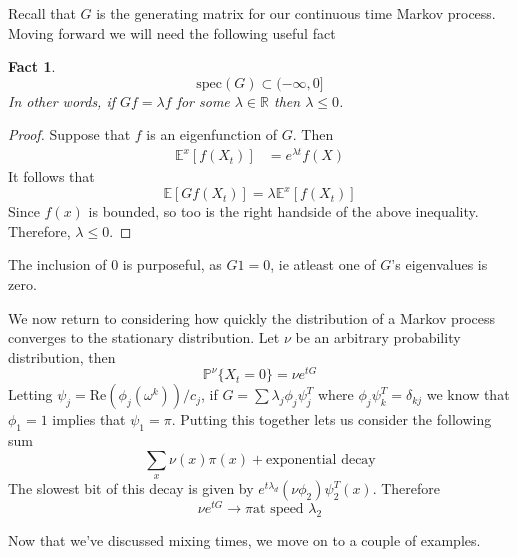 \documentclass{article}
\newtheorem{fact}{Fact}
\begin{document}
	Recall that $G$ is the generating matrix for our continuous time Markov process. Moving forward we will need the following useful fact
	
\begin{fact} \[\text{spec}(G) \subset (-\infty,0]\]
In other words, if $Gf = \lambda f$ for some $\lambda \in \mathbb{R}$ then $\lambda \leq 0$. 
\end{fact}
\begin{proof} Suppose that $f$ is an eigenfunction of $G$. Then
	\begin{align*}
		\mathbb{E}^x[f(X_t)] &= e^{\lambda t}f(X)
	\end{align*}
	It follows that
	\[\mathbb{E}[Gf(X_t)] = \lambda \mathbb{E}^{x}[f(X_t)]\]
	Since $f(x)$ is bounded, so too is the right handside of the above inequality. Therefore, $\lambda \leq 0$. 
\end{proof}

The inclusion of $0$ is purposeful, as $G1 = 0$, ie atleast one of $G$'s eigenvalues is zero. 

We now return to considering how quickly the distribution of a Markov process converges to the stationary distribution. Let $\nu$ be an arbitrary probability distribution, then
	\[\mathbb{P}^{\nu}\lbrace X_t = 0\rbrace = \nu e^{tG}\]
	Letting $\psi_j = \text{Re}(\phi_j(\omega^k))/c_j$, if $G = \sum{\lambda_j\phi_j\psi_j^T}$ where $\phi_j\psi_k^T = \delta_{kj}$
	we know that $\phi_1 = 1$ implies that $\psi_1 = \pi$. Putting this together lets us consider the following sum
	\[\sum_{x}\nu(x)\pi(x) + \text{exponential decay}\]
	The slowest bit of this decay is given by $e^{t\lambda_d}(\nu\phi_2)\psi_2^T(x)$. Therefore
	\[\nu e^{tG} \rightarrow \pi \text{at speed } \lambda_2\]
	
	Now that we've discussed mixing times, we move on to a couple of examples. 
	
\end{document}
